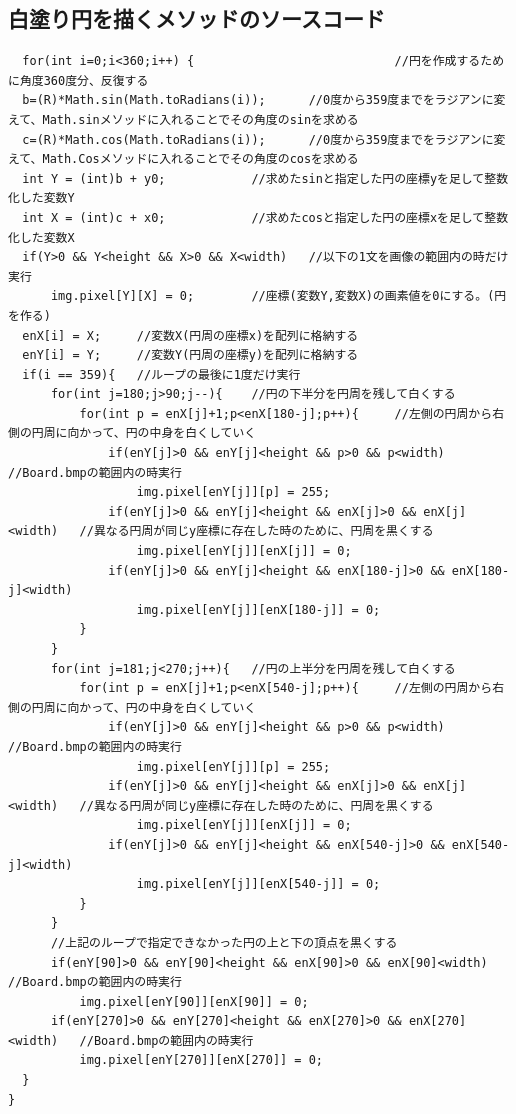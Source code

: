 \documentclass{jsarticle}
\begin{document}
\subsection{白塗り円を描くメソッドのソースコード}
\begin{verbatim}
  for(int i=0;i<360;i++) {                            //円を作成するために角度360度分、反復する
  b=(R)*Math.sin(Math.toRadians(i));      //0度から359度までをラジアンに変えて、Math.sinメソッドに入れることでその角度のsinを求める
  c=(R)*Math.cos(Math.toRadians(i));      //0度から359度までをラジアンに変えて、Math.Cosメソッドに入れることでその角度のcosを求める
  int Y = (int)b + y0;            //求めたsinと指定した円の座標yを足して整数化した変数Y
  int X = (int)c + x0;            //求めたcosと指定した円の座標xを足して整数化した変数X
  if(Y>0 && Y<height && X>0 && X<width)   //以下の1文を画像の範囲内の時だけ実行
      img.pixel[Y][X] = 0;        //座標(変数Y,変数X)の画素値を0にする。(円を作る)
  enX[i] = X;     //変数X(円周の座標x)を配列に格納する
  enY[i] = Y;     //変数Y(円周の座標y)を配列に格納する
  if(i == 359){   //ループの最後に1度だけ実行
      for(int j=180;j>90;j--){    //円の下半分を円周を残して白くする
          for(int p = enX[j]+1;p<enX[180-j];p++){     //左側の円周から右側の円周に向かって、円の中身を白くしていく
              if(enY[j]>0 && enY[j]<height && p>0 && p<width) //Board.bmpの範囲内の時実行
                  img.pixel[enY[j]][p] = 255;
              if(enY[j]>0 && enY[j]<height && enX[j]>0 && enX[j]<width)   //異なる円周が同じy座標に存在した時のために、円周を黒くする
                  img.pixel[enY[j]][enX[j]] = 0;
              if(enY[j]>0 && enY[j]<height && enX[180-j]>0 && enX[180-j]<width)
                  img.pixel[enY[j]][enX[180-j]] = 0;
          }
      }
      for(int j=181;j<270;j++){   //円の上半分を円周を残して白くする
          for(int p = enX[j]+1;p<enX[540-j];p++){     //左側の円周から右側の円周に向かって、円の中身を白くしていく
              if(enY[j]>0 && enY[j]<height && p>0 && p<width) //Board.bmpの範囲内の時実行
                  img.pixel[enY[j]][p] = 255;
              if(enY[j]>0 && enY[j]<height && enX[j]>0 && enX[j]<width)   //異なる円周が同じy座標に存在した時のために、円周を黒くする
                  img.pixel[enY[j]][enX[j]] = 0;
              if(enY[j]>0 && enY[j]<height && enX[540-j]>0 && enX[540-j]<width)
                  img.pixel[enY[j]][enX[540-j]] = 0;
          }
      }
      //上記のループで指定できなかった円の上と下の頂点を黒くする
      if(enY[90]>0 && enY[90]<height && enX[90]>0 && enX[90]<width)   //Board.bmpの範囲内の時実行
          img.pixel[enY[90]][enX[90]] = 0;
      if(enY[270]>0 && enY[270]<height && enX[270]>0 && enX[270]<width)   //Board.bmpの範囲内の時実行
          img.pixel[enY[270]][enX[270]] = 0;
  }
}
\end{verbatim}
\end{document}
